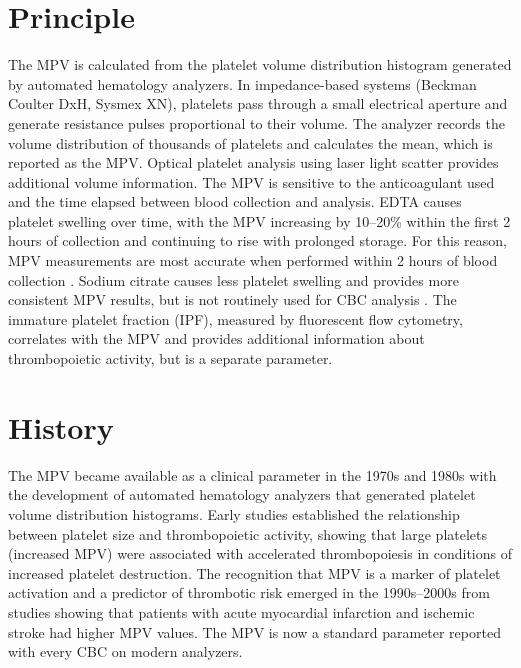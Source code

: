 \section*{Principle}
The MPV is calculated from the platelet volume distribution histogram generated by automated hematology analyzers. In impedance-based systems (Beckman Coulter DxH, Sysmex XN), platelets pass through a small electrical aperture and generate resistance pulses proportional to their volume. The analyzer records the volume distribution of thousands of platelets and calculates the mean, which is reported as the MPV. Optical platelet analysis using laser light scatter provides additional volume information. The MPV is sensitive to the anticoagulant used and the time elapsed between blood collection and analysis. EDTA causes platelet swelling over time, with the MPV increasing by 10--20\% within the first 2 hours of collection and continuing to rise with prolonged storage. For this reason, MPV measurements are most accurate when performed within 2 hours of blood collection \cite{tietz2012textbook}. Sodium citrate causes less platelet swelling and provides more consistent MPV results, but is not routinely used for CBC analysis \cite{bain2017dacie}. The immature platelet fraction (IPF), measured by fluorescent flow cytometry, correlates with the MPV and provides additional information about thrombopoietic activity, but is a separate parameter.

\section*{History}
The MPV became available as a clinical parameter in the 1970s and 1980s with the development of automated hematology analyzers that generated platelet volume distribution histograms. Early studies established the relationship between platelet size and thrombopoietic activity, showing that large platelets (increased MPV) were associated with accelerated thrombopoiesis in conditions of increased platelet destruction. The recognition that MPV is a marker of platelet activation and a predictor of thrombotic risk emerged in the 1990s--2000s from studies showing that patients with acute myocardial infarction and ischemic stroke had higher MPV values. The MPV is now a standard parameter reported with every CBC on modern analyzers.

